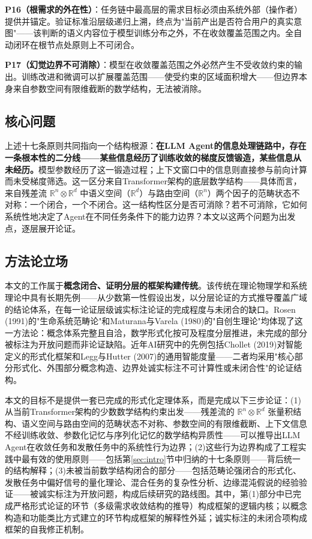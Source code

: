 \documentclass[11pt,a4paper]{article}
\theoremstyle{definition}
\begin{document}
\textbf{P16（根需求的外在性）}：任务链中最高层的需求目标必须由系统外部（操作者）提供并锚定。验证标准沿层级递归上溯，终点为"当前产出是否符合用户的真实意图"——该判断的语义内容位于模型训练分布之外，不在收敛覆盖范围之内。全自动闭环在根节点处原则上不可闭合。

\textbf{P17（幻觉边界不可消除）}：模型在收敛覆盖范围之外必然产生不受收敛约束的输出。训练改进和微调可以扩展覆盖范围——使受约束的区域面积增大——但边界本身来自参数空间有限维截断的数学结构，无法被消除。

\subsection{核心问题}

上述十七条原则共同指向一个结构根源：\textbf{在LLM Agent的信息处理链路中，存在一条根本性的二分线——某些信息经历了训练收敛的梯度反馈锻造，某些信息从未经历。}模型参数经历了这一锻造过程；上下文窗口中的信息则直接参与前向计算而未受梯度筛选。这一区分来自Transformer架构的底层数学结构——具体而言，来自残差流 $\mathbb{R}^n \otimes \mathbb{R}^d$ 中语义空间（$\mathbb{R}^d$）与路由空间（$\mathbb{R}^n$）两个因子的范畴状态不对称：一个闭合，一个不闭合。这一结构性区分是否可消除？若不可消除，它如何系统性地决定了Agent在不同任务条件下的能力边界？本文以这两个问题为出发点，逐层展开论证。

\subsection{方法论立场}

本文的工作属于\textbf{概念闭合、证明分层的框架构建传统}。该传统在理论物理学和系统理论中具有长期先例——从少数第一性假设出发，以分层论证的方式推导覆盖广域的结论体系，在每一论证层级诚实标注论证的完成程度与未闭合的缺口。Rosen (1991)的"生命系统范畴论"和Maturana与Varela (1980)的"自创生理论"均体现了这一方法论：概念体系完整且自洽，数学形式化按可及程度分层推进，未完成的部分被标注为开放问题而非论证缺陷。近年AI研究中的先例包括Chollet (2019)对智能定义的形式化框架和Legg与Hutter (2007)的通用智能度量——二者均采用"核心部分形式化、外围部分概念构造、边界处诚实标注不可计算性或未闭合性"的论证结构。

本文的目标不是提供一套已完成的形式化定理体系，而是完成以下三步论证：(1)从当前Transformer架构的少数数学结构约束出发——残差流的 $\mathbb{R}^n \otimes \mathbb{R}^d$ 张量积结构、语义空间与路由空间的范畴状态不对称、参数空间的有限维截断、上下文信息不经训练收敛、参数化记忆与序列化记忆的数学结构异质性——可以推导出LLM Agent在收敛任务和发散任务中的系统性行为边界；(2)这些行为边界构成了工程实践中最有效的使用原则——包括第\ref{sec:intro}节中归纳的十七条原则——背后统一的结构解释；(3)未被当前数学结构闭合的部分——包括范畴论强闭合的形式化、发散任务中偏好信号的量化理论、混合任务的复杂性分析、边缘混沌假说的经验验证——被诚实标注为开放问题，构成后续研究的路线图。其中，第(1)部分中已完成严格形式论证的环节（多级需求收敛结构的推导）构成框架的逻辑内核；以概念构造和功能类比方式建立的环节构成框架的解释性外延；诚实标注的未闭合项构成框架的自我修正机制。
\end{document}
